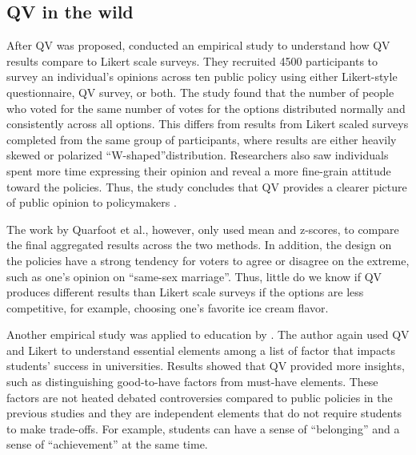 \subsection{QV in the wild}
After QV was proposed,
\textcite{quarfoot2017quadratic} conducted an 
empirical study to understand how 
QV results compare to Likert scale surveys.
They recruited 4500 participants 
to survey an individual's opinions
across ten public policy
using either Likert-style questionnaire, QV survey, or both.
The study found that the number of people
who voted for the same number of votes
for the options 
distributed normally and consistently across all options.
This differs from results from Likert scaled surveys 
completed from the same group of participants,
where results are either heavily skewed 
or polarized ``W-shaped''distribution.
Researchers also saw individuals 
spent more time expressing their opinion
and reveal a more fine-grain attitude 
toward the policies.
Thus, the study concludes that 
QV provides a clearer picture 
of public opinion to policymakers
\cite{quarfoot2017quadratic}.

The work by Quarfoot et al., however,
only used mean and z-scores,
to compare the final aggregated results 
across the two methods.
In addition, 
the design on the policies 
have a strong tendency for voters
to agree or disagree on the extreme,
such as one's opinion on ``same-sex marriage''.
Thus, little do we know if
QV produces different results 
than Likert scale surveys
if the options are less competitive,
for example, choosing one's favorite ice cream flavor.\par

Another empirical study was applied to education 
by \textcite{naylor2017first}. 
The author again used QV and Likert
to understand essential elements 
among a list of factor
that impacts students' success in universities.
Results showed that QV provided more insights, 
such as distinguishing good-to-have factors from must-have elements.
These factors are not heated debated controversies
compared to public policies in the previous studies and 
they are independent elements that do not require 
students to make trade-offs.
For example, students can have a sense of ``belonging'' and
a sense of ``achievement'' at the same time.

